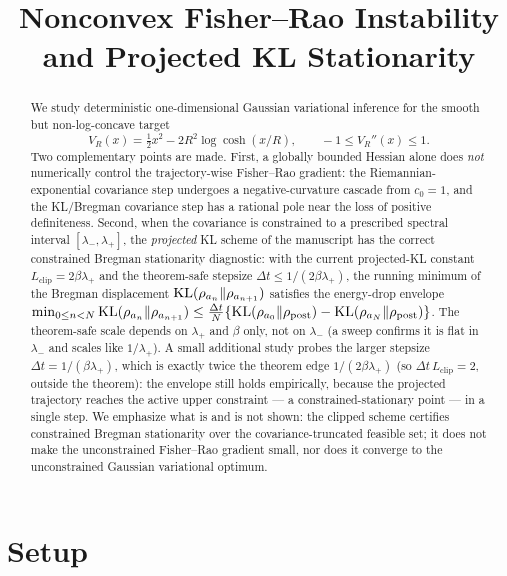 \documentclass[11pt]{article}
\title{Nonconvex Fisher--Rao Instability and Projected KL Stationarity}
\author{}
\date{}
\begin{document}
\maketitle

\begin{abstract}
We study deterministic one-dimensional Gaussian variational inference for the
smooth but non-log-concave target
\[
V_R(x)=\tfrac12 x^2-2R^2\log\cosh(x/R),
\qquad -1\leq V_R''(x)\leq 1 .
\]
Two complementary points are made. First, a globally bounded Hessian alone does
\emph{not} numerically control the trajectory-wise Fisher--Rao gradient: the
Riemannian-exponential covariance step undergoes a negative-curvature cascade
from $c_0=1$, and the KL/Bregman covariance step has a rational pole near the
loss of positive definiteness. Second, when the covariance is constrained to a
prescribed spectral interval $[\lambda_-,\lambda_+]$, the \emph{projected} KL
scheme of the manuscript has the correct constrained Bregman stationarity
diagnostic: with the current projected-KL constant
$L_{\mathrm{clip}}=2\beta\lambda_+$ and the theorem-safe stepsize
$\Delta t\le 1/(2\beta\lambda_+)$, the running minimum of the Bregman displacement
$\mathrm{KL}(\rho_{a_n}\|\rho_{a_{n+1}})$ satisfies the energy-drop envelope
$\min_{0\le n<N}\mathrm{KL}(\rho_{a_n}\|\rho_{a_{n+1}})\le
\frac{\Delta t}{N}\{\mathrm{KL}(\rho_{a_0}\|\rho_{\mathrm{post}})-\mathrm{KL}(\rho_{a_N}\|\rho_{\mathrm{post}})\}$.
The theorem-safe scale depends on $\lambda_+$ and $\beta$ only, not on
$\lambda_-$ (a sweep confirms it is flat in $\lambda_-$ and scales like
$1/\lambda_+$). A small additional study probes the larger stepsize
$\Delta t=1/(\beta\lambda_+)$, which is exactly twice the theorem edge
$1/(2\beta\lambda_+)$ (so $\Delta t\,L_{\mathrm{clip}}=2$, outside the theorem):
the envelope still holds empirically, because the projected trajectory reaches the
active upper constraint --- a constrained-stationary point --- in a single step.
We emphasize what is and is not shown: the clipped scheme certifies constrained
Bregman stationarity over the covariance-truncated feasible set; it does not make
the unconstrained Fisher--Rao gradient small, nor does it converge to the
unconstrained Gaussian variational optimum.
\end{abstract}

\section{Setup}
\label{sec:setup}
\end{document}

